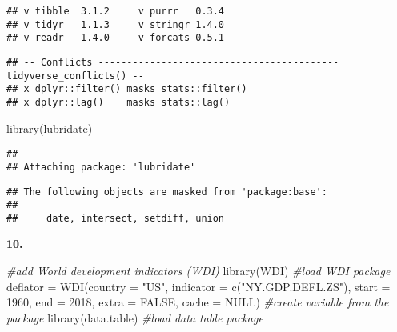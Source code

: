 \documentclass[
]{article}
\newenvironment{Shaded}{\begin{snugshade}}{\end{snugshade}}
\newcommand{\AttributeTok}[1]{\textcolor[rgb]{0.77,0.63,0.00}{#1}}
\newcommand{\CommentTok}[1]{\textcolor[rgb]{0.56,0.35,0.01}{\textit{#1}}}
\newcommand{\ConstantTok}[1]{\textcolor[rgb]{0.00,0.00,0.00}{#1}}
\newcommand{\DecValTok}[1]{\textcolor[rgb]{0.00,0.00,0.81}{#1}}
\newcommand{\FunctionTok}[1]{\textcolor[rgb]{0.00,0.00,0.00}{#1}}
\newcommand{\NormalTok}[1]{#1}
\newcommand{\OtherTok}[1]{\textcolor[rgb]{0.56,0.35,0.01}{#1}}
\newcommand{\SpecialCharTok}[1]{\textcolor[rgb]{0.00,0.00,0.00}{#1}}
\newcommand{\StringTok}[1]{\textcolor[rgb]{0.31,0.60,0.02}{#1}}
\begin{document}
\begin{verbatim}
## v tibble  3.1.2     v purrr   0.3.4
## v tidyr   1.1.3     v stringr 1.4.0
## v readr   1.4.0     v forcats 0.5.1
\end{verbatim}

\begin{verbatim}
## -- Conflicts ------------------------------------------ tidyverse_conflicts() --
## x dplyr::filter() masks stats::filter()
## x dplyr::lag()    masks stats::lag()
\end{verbatim}

\begin{Shaded}
\begin{Highlighting}[]
\FunctionTok{library}\NormalTok{(lubridate)}
\end{Highlighting}
\end{Shaded}

\begin{verbatim}
## 
## Attaching package: 'lubridate'
\end{verbatim}

\begin{verbatim}
## The following objects are masked from 'package:base':
## 
##     date, intersect, setdiff, union
\end{verbatim}

\begin{Shaded}
\end{Shaded}

\textbf{10. }

\begin{Shaded}
\begin{Highlighting}[]
\CommentTok{\#add World development indicators (WDI)}
\FunctionTok{library}\NormalTok{(WDI) }\CommentTok{\#load WDI package}
\NormalTok{deflator }\OtherTok{=} \FunctionTok{WDI}\NormalTok{(}\AttributeTok{country =} \StringTok{"US"}\NormalTok{, }\AttributeTok{indicator =} \FunctionTok{c}\NormalTok{(}\StringTok{"NY.GDP.DEFL.ZS"}\NormalTok{), }\AttributeTok{start =} \DecValTok{1960}\NormalTok{, }\AttributeTok{end =} \DecValTok{2018}\NormalTok{, }\AttributeTok{extra =} \ConstantTok{FALSE}\NormalTok{, }\AttributeTok{cache =} \ConstantTok{NULL}\NormalTok{) }\CommentTok{\#create variable from the package}
\FunctionTok{library}\NormalTok{(data.table) }\CommentTok{\#load data table package}
\end{Highlighting}
\end{Shaded}
\end{document}
